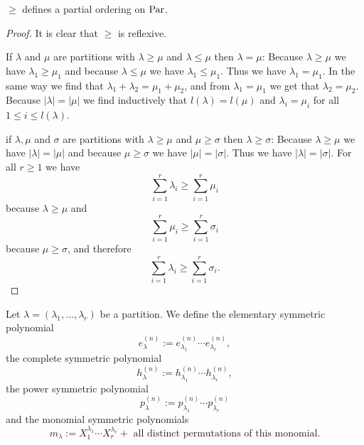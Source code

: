 \begin{lem}
 $\geq$ defines a partial ordering on $\operatorname{Par}$.
\end{lem}
\begin{proof}
 It is clear that $\geq$ is reflexive.
 
 If $\lambda$ and $\mu$ are partitions with $\lambda \geq \mu$ and $\lambda \leq \mu$ then $\lambda = \mu$: Because $\lambda \geq \mu$ we have $\lambda_1 \geq \mu_1$ and because $\lambda \leq \mu$ we have $\lambda_1 \leq \mu_1$. Thus we have $\lambda_1 = \mu_1$. In the same way we find that $\lambda_1 + \lambda_2 = \mu_1 + \mu_2$, and from $\lambda_1 = \mu_1$ we get that $\lambda_2 = \mu_2$. Because $|\lambda| = |\mu|$ we find inductively that $l(\lambda) = l(\mu)$ and $\lambda_i = \mu_i$ for all $1 \leq i \leq l(\lambda)$.
 
 if $\lambda, \mu$ and $\sigma$ are partitions with $\lambda \geq \mu$ and $\mu \geq \sigma$ then $\lambda \geq \sigma$: Because $\lambda \geq \mu$ we have $|\lambda| = |\mu|$ and because $\mu \geq \sigma$ we have $|\mu| = |\sigma|$. Thus we have $|\lambda| = |\sigma|$. For all $r \geq 1$ we have
 \[
  \sum_{i=1}^r \lambda_i \geq \sum_{i=1}^r \mu_i
 \]
 because $\lambda \geq \mu$ and
 \[
  \sum_{i=1}^r \mu_i \geq \sum_{i=1}^r \sigma_i
 \]
 because $\mu \geq \sigma$, and therefore
 \[
  \sum_{i=1}^r \lambda_i \geq \sum_{i=1}^r \sigma_i.
 \]
\end{proof}


\begin{defi}
 Let $\lambda = (\lambda_1, \ldots, \lambda_r)$ be a partition. We define the elementary symmetric polynomial
 \[
  e^{(n)}_\lambda := e^{(n)}_{\lambda_1} \cdots e^{(n)}_{\lambda_r},
 \]
 the complete symmetric polynomial
 \[
  h^{(n)}_\lambda := h^{(n)}_{\lambda_1} \cdots h^{(n)}_{\lambda_r},
 \]
 the power symmetric polynomial
 \[
  p^{(n)}_\lambda := p^{(n)}_{\lambda_1} \cdots p^{(n)}_{\lambda_r}
 \]
 and the monomial symmetric polynomials
 \[
  m_\lambda := X_1^{\lambda_1} \cdots X_r^{\lambda_r} + \text{ all distinct permutations of this monomial}.
 \]
\end{defi}


